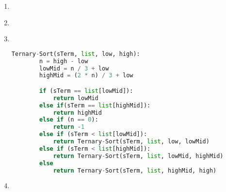 \documentclass[paper=a4, fontsize=11pt]{scrartcl} %
\numberwithin{equation}{section} %
\numberwithin{figure}{section} %
\numberwithin{table}{section} %
\begin{document}
\begin{enumerate}
    \item \hfill \\

    \item \hfill \\

    \item \hfill \\
    \begin{lstlisting}[language=Python]
    Ternary-Sort(sTerm, list, low, high):
        n = high - low
        lowMid = n / 3 + low
        highMid = (2 * n) / 3 + low

        if (sTerm == list[lowMid]):
            return lowMid
        else if(sTerm == list[highMid]):
            return highMid
        else if (n == 0):
            return -1
        else if (sTerm < list[lowMid]):
            return Ternary-Sort(sTerm, list, low, lowMid)
        else if (sTerm < list[highMid]):
            return Ternary-Sort(sTerm, list, lowMid, highMid)
        else
            return Ternary-Sort(sTerm, list, highMid, high)
    \end{lstlisting}
    \item \hfill \\
\end{enumerate}
\end{document}
